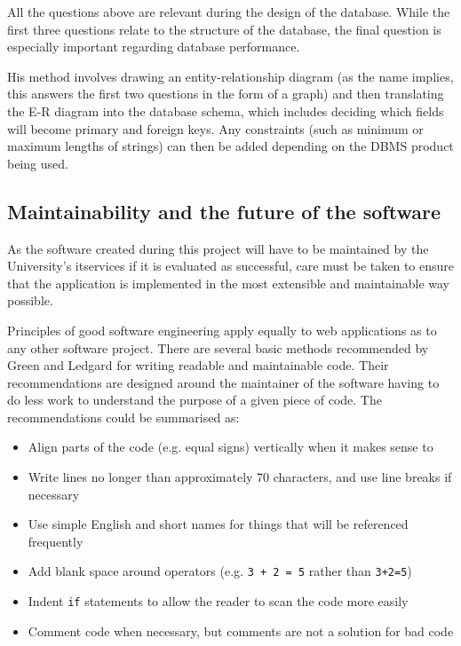 \documentclass[draft]{scrartcl}
\begin{document}
All the questions above are relevant during the design of the database. While
the first three questions relate to the structure of the database, the final
question is especially important regarding database performance.

His method involves drawing an entity-relationship diagram (as the name
implies, this answers the first two questions in the form of a graph) and then
translating the E-R diagram into the database schema, which includes deciding
which fields will become primary and foreign keys. Any constraints (such as
minimum or maximum lengths of strings) can then be added depending on the DBMS
product being used.

\subsection{Maintainability and the future of the software}
\label{sec:maintainability}

As the software created during this project will have to be maintained by the
University's \gls{itservices} if it is evaluated as successful, care must be
taken to ensure that the application is implemented in the most extensible and
maintainable way possible.

Principles of good software engineering apply equally to web applications as
to any other software project. There are several basic methods recommended by
Green and Ledgard \cite{Green:2011:CGF:2063166.2063168} for writing readable
and maintainable code. Their recommendations are designed around the
maintainer of the software having to do less work to understand the purpose of
a given piece of code. The recommendations could be summarised as:

\begin{itemize}
  \item Align parts of the code (e.g. equal signs) vertically when it makes sense to
  \item Write lines no longer than approximately 70 characters, and use line breaks if necessary
  \item Use simple English and short names for things that will be referenced frequently
  \item Add blank space around operators (e.g. \texttt{3 + 2 = 5} rather than \texttt{3+2=5})
  \item Indent \texttt{if} statements to allow the reader to scan the code more easily
  \item Comment code when necessary, but comments are not a solution for bad code
\end{itemize}
\end{document}
